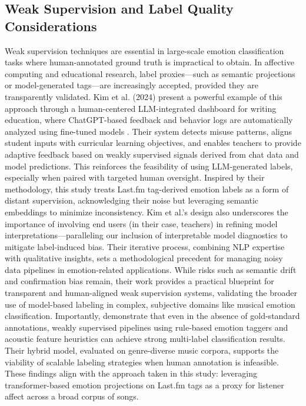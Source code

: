 \documentclass{article}
\begin{document}
\subsection{Weak Supervision and Label Quality Considerations}

Weak supervision techniques are essential in large-scale emotion classification tasks where human-annotated ground truth is impractical to obtain. In affective computing and educational research, label proxies—such as semantic projections or model-generated tags—are increasingly accepted, provided they are transparently validated. Kim et al. (2024) present a powerful example of this approach through a human-centered LLM-integrated dashboard for writing education, where ChatGPT-based feedback and behavior logs are automatically analyzed using fine-tuned models \parencite{Kim2024}. Their system detects misuse patterns, aligns student inputs with curricular learning objectives, and enables teachers to provide adaptive feedback based on weakly supervised signals derived from chat data and model predictions. This reinforces the feasibility of using LLM-generated labels, especially when paired with targeted human oversight. Inspired by their methodology, this study treats Last.fm tag-derived emotion labels as a form of distant supervision, acknowledging their noise but leveraging semantic embeddings to minimize inconsistency. Kim et al.’s design also underscores the importance of involving end users (in their case, teachers) in refining model interpretations—paralleling our inclusion of interpretable model diagnostics to mitigate label-induced bias. Their iterative process, combining NLP expertise with qualitative insights, sets a methodological precedent for managing noisy data pipelines in emotion-related applications. While risks such as semantic drift and confirmation bias remain, their work provides a practical blueprint for transparent and human-aligned weak supervision systems, validating the broader use of model-based labeling in complex, subjective domains like musical emotion classification. Importantly, \textcite{Tuba2025} demonstrate that even in the absence of gold-standard annotations, weakly supervised pipelines using rule-based emotion taggers and acoustic feature heuristics can achieve strong multi-label classification results. Their hybrid model, evaluated on genre-diverse music corpora, supports the viability of scalable labeling strategies when human annotation is infeasible. These findings align with the approach taken in this study: leveraging transformer-based emotion projections on Last.fm tags as a proxy for listener affect across a broad corpus of songs.
\end{document}
